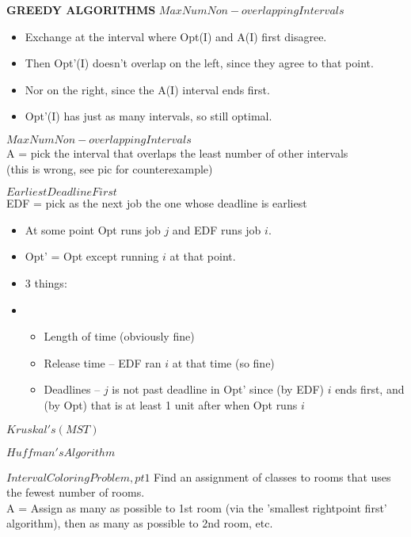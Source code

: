 \documentclass[12pt]{article}
\providecommand{\tightlist}{
    \setlength{\itemsep}{0pt}\setlength{\parskip}{0pt}
}
\begin{document}
\textbf{GREEDY ALGORITHMS}
$Max Num Non-overlapping Intervals$
\begin{itemize}
  \item Exchange at the interval where Opt(I) and A(I) first disagree.
  \item Then Opt'(I) doesn't overlap on the left, since they agree to that point.
  \item Nor on the right, since the A(I) interval ends first.
  \item Opt'(I) has just as many intervals, so still optimal.
\end{itemize}

$Max Num Non-overlapping Intervals$\\
A = pick the interval that overlaps the least number of other intervals\\
(this is wrong, see pic for counterexample)


$Earliest Deadline First$\\
EDF = pick as the next job the one whose deadline is earliest
\begin{itemize}\tightlist
  \item At some point Opt runs job $j$ and EDF runs job $i$.
  \item Opt' = Opt except running $i$ at that point.
  \item 3 things:
  \item \begin{itemize}\tightlist
    \item Length of time (obviously fine)
    \item Release time -- EDF ran $i$ at that time (so fine)
    \item Deadlines -- $j$ is not past deadline in Opt' since (by EDF) $i$ ends first, and (by Opt) that is at least 1 unit after when Opt runs $i$
  \end{itemize}
\end{itemize}


$Kruskal's (MST)$

$Huffman's Algorithm$


$Interval Coloring Problem, pt 1$
Find an assignment of classes to rooms that uses the fewest number of rooms.\\
A = Assign as many as possible to 1st room (via the 'smallest rightpoint first' algorithm), then as many as possible to 2nd room, etc.
\end{document}
